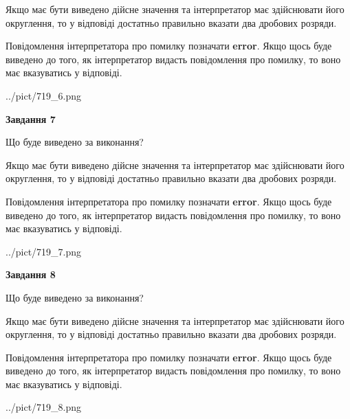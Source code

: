 \documentclass[12pt, ukrainian]{article}
\begin{document}
{\begin {Large}
Якщо має бути виведено дійсне значення та інтерпретатор має здійснювати його округлення, 
то у відповіді достатньо правильно вказати два дробових розряди.

Повідомлення інтерпретатора про помилку позначати \textbf{error}.
Якщо щось буде виведено до того, як інтерпретатор видасть повідомлення про помилку, 
то воно має вказуватись у відповіді. \par

\begin{center}
	{../pict/719_6.png}
\end{center}
\newpage

{\begin {center}\textbf{Завдання 7}\end {center}}\par
Що буде виведено за виконання? \par

Якщо має бути виведено дійсне значення та інтерпретатор має здійснювати його округлення, 
то у відповіді достатньо правильно вказати два дробових розряди.

Повідомлення інтерпретатора про помилку позначати \textbf{error}.
Якщо щось буде виведено до того, як інтерпретатор видасть повідомлення про помилку, 
то воно має вказуватись у відповіді. \par

\begin{center}
	{../pict/719_7.png}
\end{center}
\newpage

{\begin {center}\textbf{Завдання 8}\end {center}}\par
Що буде виведено за виконання? \par

Якщо має бути виведено дійсне значення та інтерпретатор має здійснювати його округлення, 
то у відповіді достатньо правильно вказати два дробових розряди.

Повідомлення інтерпретатора про помилку позначати \textbf{error}.
Якщо щось буде виведено до того, як інтерпретатор видасть повідомлення про помилку, 
то воно має вказуватись у відповіді. \par

\begin{center}
	{../pict/719_8.png}
\end{center}
\newpage


\end{Large}}
\end{document}
